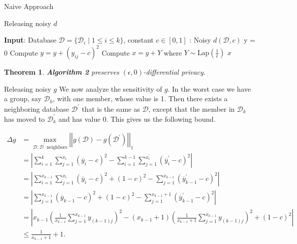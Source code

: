 \documentclass[11pt]{article}
\newtheorem{theorem}{Theorem}
\begin{document}
\begin{section}{Naive Approach}
\begin{subsection}{Releasing noisy $d$}
\pagebreak

\begin{algorithm}
  \caption{}
  \label{alg-label}
  \begin{algorithmic}
    \STATE \textbf{Input}: Database $\mathcal{D} = \{\mathcal{D}_i \; |\; 
    1\leq i \leq k \}$, constant $c\in [0,1]$
    \STATE {}: Noisy $d(\mathcal{D},c)$
    \STATE y = 0
        \STATE Compute $y = y + (y_{ij} - c)^2$
      \ENDFOR
    \ENDFOR
    \STATE Compute $x = y + Y$ where $Y\sim \text{Lap}(\frac{1}{\epsilon})$
    \RETURN $x$
  \end{algorithmic}
\end{algorithm}

\begin{theorem}{}
\textbf{Algorithm 2} preserves $(\epsilon,0)$-differential privacy.
\end{theorem}
\end{subsection}


\begin{subsection}{Releasing noisy $g$}
We now analyze the sensitivity of $g$. In the worst case we have a group, 
say $\mathcal{D}_k$, with one member, whose value is 1. Then there exists a 
neighboring database $\mathcal{D}^{'}$ that is the same as $\mathcal{D}$, 
except that the member in $\mathcal{D}_k$ has moved to $\mathcal{D}_k^{'}$ 
and has value 0. This gives us the following bound.

\begin{align*}
\Delta g &= \max_{\mathcal{D},\mathcal{D}^{'} \text{ neighbors}} 
  \left|\left|
    g(\mathcal{D}) - g(\mathcal{D}^{'})
  \right|\right|_1\\
&= \left|
     \sum_{i=1}^k \sum_{j=1}^{x_i}
       \left(
         \overline{y}_i - c
       \right) ^2 - 
     \sum_{i=1}^{k-1} \sum_{j=1}^{x_i^{'}} 
       \left(
         \overline{y}_i^{'} - c
       \right) ^2
     \right|\\
&= \left|
     \sum_{i=1}^{x_{k-1}} \sum_{j=1}^{x_i}
       \left(
         \overline{y}_i - c
       \right) ^2 +
       \left(
         1-c
       \right) ^2 - 
     \sum_{j=1}^{x_{k-1}}
       \left(
         \overline{y}_{k-1}^{'} - c
       \right) ^2
   \right|\\
&= \left|
     \sum_{j=1}^{x_{k-1}}
       \left(
         \overline{y}_{k-1} - c
       \right) ^2 +
       \left(
         1 - c
       \right) ^2 - 
     \sum_{j=1}^{x_{k-1}+1}
       \left(
         \overline{y}_{k-1}^{'} - c
       \right) ^2
   \right|\\
&= \left|
     x_{k-1}
       \left(
         \frac{1}{x_{k-1}} \sum_{j=1}^{x_{k-1}} y_{(k-1)j}
       \right) ^2 - 
     (x_{k-1} + 1)
       \left(
         \frac{1}{x_{k-1} + 1} \sum_{j=1}^{x_{k-1}} y_{(k-1)j}
       \right) ^2 +
     (1 - c)^2
   \right|\\
&\leq \frac{1}{x_{k-1} + 1} + 1.
\end{align*}


\end{subsection}
\end{section}
\end{document}
